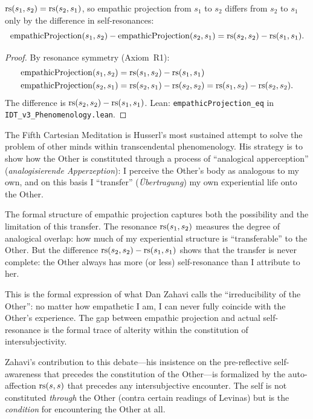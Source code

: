 \begin{theorem}
\label{thm:empathy-commutative}
$\mathrm{rs}(s_1, s_2) = \mathrm{rs}(s_2, s_1)$, so empathic projection from $s_1$ to $s_2$
differs from $s_2$ to $s_1$ only by the difference in self-resonances:
\[
\mathrm{empathicProjection}(s_1, s_2) - \mathrm{empathicProjection}(s_2, s_1)
= \mathrm{rs}(s_2, s_2) - \mathrm{rs}(s_1, s_1).
\]
\end{theorem}

\begin{proof}
By resonance symmetry (Axiom~R1):
\begin{align*}
\mathrm{empathicProjection}(s_1, s_2) &= \mathrm{rs}(s_1, s_2) - \mathrm{rs}(s_1, s_1) \\
\mathrm{empathicProjection}(s_2, s_1) &= \mathrm{rs}(s_2, s_1) - \mathrm{rs}(s_2, s_2)
= \mathrm{rs}(s_1, s_2) - \mathrm{rs}(s_2, s_2).
\end{align*}
The difference is $\mathrm{rs}(s_2, s_2) - \mathrm{rs}(s_1, s_1)$.
Lean: \texttt{empathicProjection\_eq} in \texttt{IDT\_v3\_Phenomenology.lean}.
\end{proof}

\begin{interpretation}
\label{interp:husserl-fifth-meditation}
The Fifth Cartesian Meditation is Husserl's most sustained attempt to solve the
problem of other minds within transcendental phenomenology.  His strategy is to
show how the Other is constituted through a process of ``analogical
apperception'' (\textit{analogisierende Apperzeption}): I perceive the Other's
body as analogous to my own, and on this basis I ``transfer'' (\textit{\"Ubertragung})
my own experiential life onto the Other.

The formal structure of empathic projection captures both the possibility and
the limitation of this transfer.  The resonance $\mathrm{rs}(s_1, s_2)$ measures the
degree of analogical overlap: how much of my experiential structure is
``transferable'' to the Other.  But the difference $\mathrm{rs}(s_2, s_2) - \mathrm{rs}(s_1, s_1)$
shows that the transfer is never complete: the Other always has more (or less)
self-resonance than I attribute to her.

This is the formal expression of what Dan Zahavi calls the ``irreducibility
of the Other'': no matter how empathetic I am, I can never fully coincide
with the Other's experience.  The gap between empathic projection and actual
self-resonance is the formal trace of alterity within the constitution of
intersubjectivity.

Zahavi's contribution to this debate---his insistence on the pre-reflective
self-awareness that precedes the constitution of the Other---is formalized
by the auto-affection $\mathrm{rs}(s, s)$ that precedes any intersubjective encounter.
The self is not constituted \emph{through} the Other (contra certain readings
of Levinas) but is the \emph{condition} for encountering the Other at all.
\end{interpretation}

